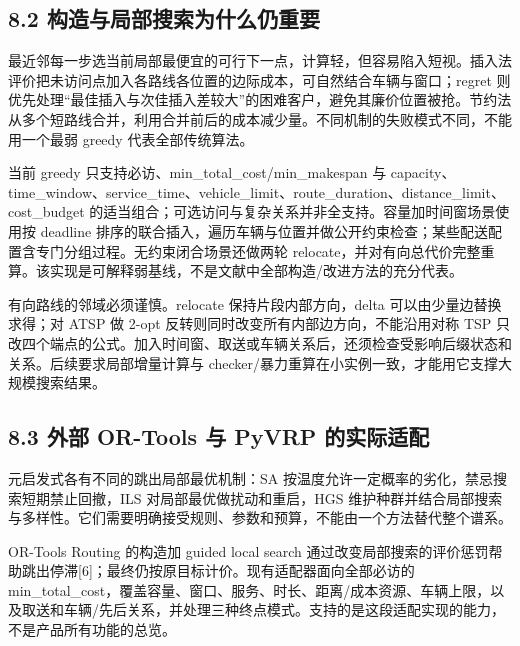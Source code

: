 \documentclass[UTF8,10pt,a4paper,fontset=fandol]{ctexart}
\begin{document}
\subsection*{8.2 构造与局部搜索为什么仍重要}


最近邻每一步选当前局部最便宜的可行下一点，计算轻，但容易陷入短视。插入法评价把未访问点加入各路线各位置的边际成本，可自然结合车辆与窗口；regret 则优先处理“最佳插入与次佳插入差较大”的困难客户，避免其廉价位置被抢。节约法从多个短路线合并，利用合并前后的成本减少量。不同机制的失败模式不同，不能用一个最弱 greedy 代表全部传统算法。


当前 greedy 只支持必访、min\_\allowbreak{}total\_\allowbreak{}cost/\allowbreak{}min\_\allowbreak{}makespan 与 capacity、time\_\allowbreak{}window、service\_\allowbreak{}time、vehicle\_\allowbreak{}limit、route\_\allowbreak{}duration、distance\_\allowbreak{}limit、cost\_\allowbreak{}budget 的适当组合；可选访问与复杂关系并非全支持。容量加时间窗场景使用按 deadline 排序的联合插入，遍历车辆与位置并做公开约束检查；某些配送配置含专门分组过程。无约束闭合场景还做两轮 relocate，并对有向总代价完整重算。该实现是可解释弱基线，不是文献中全部构造/\allowbreak{}改进方法的充分代表。


有向路线的邻域必须谨慎。relocate 保持片段内部方向，delta 可以由少量边替换求得；对 ATSP 做 2-opt 反转则同时改变所有内部边方向，不能沿用对称 TSP 只改四个端点的公式。加入时间窗、取送或车辆关系后，还须检查受影响后缀状态和关系。后续要求局部增量计算与 checker/\allowbreak{}暴力重算在小实例一致，才能用它支撑大规模搜索结果。


\subsection*{8.3 外部 OR-Tools 与 PyVRP 的实际适配}


元启发式各有不同的跳出局部最优机制：SA 按温度允许一定概率的劣化，禁忌搜索短期禁止回撤，ILS 对局部最优做扰动和重启，HGS 维护种群并结合局部搜索与多样性。它们需要明确接受规则、参数和预算，不能由一个方法替代整个谱系。


OR-Tools Routing 的构造加 guided local search 通过改变局部搜索的评价惩罚帮助跳出停滞[6]；最终仍按原目标计价。现有适配器面向全部必访的 min\_\allowbreak{}total\_\allowbreak{}cost，覆盖容量、窗口、服务、时长、距离/\allowbreak{}成本资源、车辆上限，以及取送和车辆/\allowbreak{}先后关系，并处理三种终点模式。支持的是这段适配实现的能力，不是产品所有功能的总览。
\end{document}
